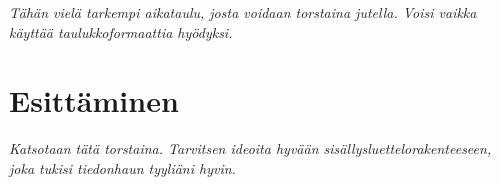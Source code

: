 \documentclass[12pt,a4paper,finnish,oneside]{article}
\begin{document}
\emph{Tähän vielä tarkempi aikataulu, josta voidaan torstaina jutella. Voisi vaikka käyttää taulukkoformaattia hyödyksi.}

\section{Esittäminen}

\emph{Katsotaan tätä torstaina. Tarvitsen ideoita hyvään sisällysluettelorakenteeseen, joka tukisi tiedonhaun tyyliäni hyvin.}

%


% 

\renewcommand{\refname}{Lähteet}  %



\end{document}

